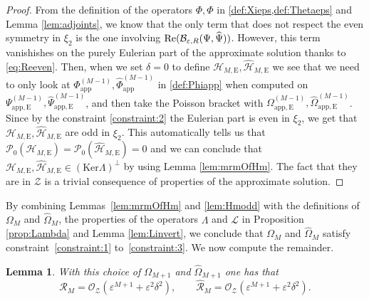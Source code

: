 \documentclass[11pt,reqno,a4paper]{amsart}
\def\eps{\varepsilon}
\def\Re{{\rm Re}}
\newcommand{\cB}{\mathcal{B}}
\newcommand{\cH}{\mathcal{H}}
\newcommand{\cL}{\mathcal{L}}
\newcommand{\cO}{\mathcal{O}}
\newcommand{\cP}{\mathcal{P}}
\newcommand{\cR}{\mathcal{R}}
\newcommand{\cZ}{\mathcal{Z}}
\newcommand{\1}{\mathbbm{1}}
\newtheorem{lemma}[proposition]{Lemma}
\theoremstyle{definition}
\theoremstyle{definition}
\numberwithin{equation}{section}
\newcommand{\Mapp}[2]{#1^{(#2)}_\mathrm{app}}
\newcommand{\Mappp}[3]{#1^{(#2)}_\mathrm{app,#3}}
\begin{document}
    \begin{proof}
        From the definition of the operators $\Phi,\widehat{\Phi}$ in \cref{def:Xieps,def:Thetaeps} and Lemma \ref{lem:adjoints}, we know that the only term that does not respect the even symmetry in $\xi_2$ is the one involving $\Re(\cB_{\eps,R}(\Psi,\widehat{\Psi}))$. However, this term vanishishes on the purely Eulerian part of the approximate solution thanks to \cref{eq:Reeven}. Then,  when we set $\delta=0$ to define $\cH_{M,\mathrm{E}},\widehat{\cH}_{M,\mathrm{E}}$ we see that we need to only look at $\Mapp{\Phi}{M-1}, \Mapp{\widehat{\Phi}}{M-1}$ in \cref{def:Phiapp} when computed on $\Mappp{\Psi}{M-1}{E}, \Mappp{\widehat{\Psi}}{M-1}{E}$, and then take the Poisson bracket with $\Mappp{\Omega}{M-1}{E}, \Mappp{\widehat{\Omega}}{M-1}{E}$. Since by the constraint  \cref{constraint:2} the Eulerian part is even in $\xi_2$, we get that $\cH_{M,\mathrm{E}},\widehat{\cH}_{M,\mathrm{E}}$ are odd in $\xi_2$. This automatically tells us that $\cP_0(\cH_{M,\mathrm{E}})=\cP_0(\widehat{\cH}_{M,\mathrm{E}})=0$ and we can conclude that $\cH_{M,\mathrm{E}},\widehat{\cH}_{M,\mathrm{E}} \in (\mathrm{Ker} \Lambda)^\perp$ by using Lemma \ref{lem:mrmOfHm}. The fact that they are in $\cZ$ is a trivial consequence of properties of the approximate solution.    \end{proof}
    By combining Lemmas~\ref{lem:mrmOfHm} and \ref{lem:Hmodd} with the definitions of $\Omega_M$ and $\widehat{\Omega}_M$, the properties of the operators $\Lambda$ and $\cL$ in Proposition \ref{prop:Lambda} and Lemma \ref{lem:Linvert}, we conclude that $\Omega_M$ and $\widehat{\Omega}_M$ satisfy constraint~\ref{constraint:1} to~\ref{constraint:3}. We now compute the remainder.
\begin{lemma} With this choice of $\Omega_{M+1}$ and $\widehat{\Omega}_{M+1}$ one has that
    \begin{equation}
        \cR_{M} = \cO_\cZ(\eps^{M+1} + \eps^2 \delta^2), \qquad \widehat{\cR}_{M} = \cO_\cZ(\eps^{M+1} + \eps^2\delta^2).
    \end{equation}
\end{lemma}
\end{document}
